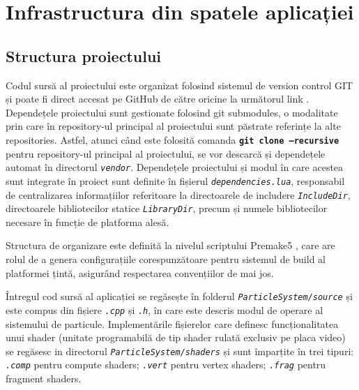 \chapter{Infrastructura din spatele aplicației}

\section{Structura proiectului}
Codul sursă al proiectului este organizat folosind sistemul de version control GIT \cite{GIT_citation} și poate fi direct accesat pe GitHub de către oricine la următorul link \cite{GithubRepository_citation}. Dependețele proiectului sunt gestionate folosind git submodules, o modalitate prin care în repository-ul principal al proiectului sunt păstrate referințe la alte repositories. Astfel, atunci când este folosită comanda \textbf{\texttt{git clone --recursive}} pentru repository-ul principal al proiectului, se vor descarcă și dependețele automat în directorul \textit{\texttt{vendor}}. Dependețele proiectului și modul în care acestea sunt integrate în proiect sunt definite în fișierul \textit{\texttt{dependencies.lua}}, responsabil de centralizarea informațiilor referitoare la directoarele de includere \textit{\texttt{IncludeDir}}, directoarele bibliotecilor statice \textit{\texttt{LibraryDir}}, precum și numele bibliotecilor necesare în funcție de platforma alesă. 

Structura de organizare este definită la nivelul scriptului Premake5 \cite{Premake5_citation}, care are rolul de a genera configurațiile corespunzătoare pentru sistemul de build al platformei țintă, asigurând respectarea convențiilor de mai jos. 

Întregul cod sursă al aplicației se regăsește în folderul \textit{\texttt{ParticleSystem/source}} și este compus din fișiere \textit{\texttt{.cpp}} și \textit{\texttt{.h}}, în care este descris modul de operare al sistemului de particule. Implementările fișierelor care definesc funcționalitatea unui shader (unitate programabilă de tip shader rulată exclusiv pe placa video) se regăsesc in directorul \textit{\texttt{ParticleSystem/shaders}} și sunt împarțite în trei tipuri: \textit{\texttt{.comp}} pentru compute shaders; \textit{\texttt{.vert}} pentru vertex shaders; \textit{\texttt{.frag}} pentru fragment shaders. 

